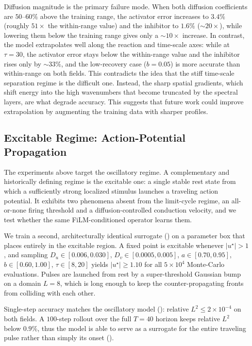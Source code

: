 \documentclass[runningheads]{llncs}
\begin{document}
Diffusion magnitude is the primary failure mode. When both diffusion coefficients are $50$--$60\%$ above the training range, the activator error increases to $3.4\%$ (roughly $51\times$ the within-range value) and the inhibitor to $1.6\%$ ($\sim$$20\times$), while lowering them below the training range gives only a $\sim$$10\times$ increase. In contrast, the model extrapolates well along the reaction and time-scale axes: while at $\tau{=}30$, the activator error stays below the within-range value and the inhibitor rises only by $\sim$$33\%$, and the low-recovery case ($b{=}0.05$) is more accurate than within-range on both fields. This contradicts the idea that the stiff time-scale separation regime is the difficult one. Instead, the sharp spatial gradients, which shift energy into the high wavenumbers that become truncated by the spectral layers, are what degrade accuracy. This suggests that future work could improve extrapolation by augmenting the training data with sharper profiles.

\subsection{Excitable Regime: Action-Potential Propagation}
\label{sec:excitable_results}

The experiments above target the oscillatory regime. A complementary and historically defining regime is the excitable one: a single stable rest state from which a sufficiently strong localized stimulus launches a traveling action potential. It exhibits two phenomena absent from the limit-cycle regime, an all-or-none firing threshold and a diffusion-controlled conduction velocity, and we test whether the same FiLM-conditioned operator learns them.

We train a second, architecturally identical surrogate () on a parameter box that  places entirely in the excitable region. A fixed point is excitable whenever $|u^\star| > 1$, and sampling $D_u \in [0.006, 0.030]$, $D_v \in [0.0005, 0.005]$, $a \in [0.70, 0.95]$, $b \in [0.60, 1.00]$, $\tau \in [8, 20]$ yields $|u^\star| \ge 1.10$ for all $5{\times}10^4$ Monte-Carlo evaluations. Pulses are launched from rest by a super-threshold Gaussian bump on a domain $L = 8$, which is long enough to keep the counter-propagating fronts from colliding with each other.

Single-step accuracy matches the oscillatory model (): relative $L^2 \le 2 \times 10^{-4}$ on both fields. A $100$-step rollout over the full $T = 40$ horizon keeps relative $L^2$ below $0.9\%$, thus the model is able to serve as a surrogate for the entire traveling pulse rather than simply its onset ().
\end{document}
